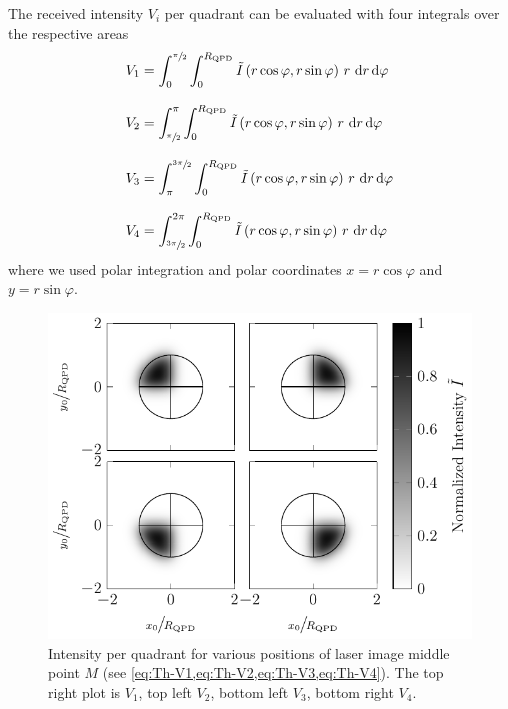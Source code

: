 The received intensity $V_{i}$ per quadrant can be evaluated with four 
integrals over the respective areas
\begin{subequations}
\begin{align}
  V_{\mathrm{1}} & = \int_{0}^{\sfrac{\pi}{2}}\int_{0}^{R_{\mathrm{QPD}}}
  \tilde{I}\left( r\cos\varphi, r\sin\varphi 
  \right)\,r\,\dd{r}\dd{\varphi}
  \label{eq:Th-V1}
  \\[3mm]
  V_{\mathrm{2}} & = \int_{\sfrac{\pi}{2}}^{\pi}\int_{0}^{R_{\mathrm{QPD}}}
  \tilde{I}\left(r\cos\varphi, 
  r\sin\varphi\right)\,r\,\dd{r}\dd{\varphi}
  \label{eq:Th-V2}
  \\[3mm]
  V_{\mathrm{3}} & = \int_{\pi}^{\sfrac{3\pi}{2}}\int_{0}^{R_{\mathrm{QPD}}}
  \tilde{I}\left(r\cos\varphi, 
  r\sin\varphi\right)\,r\,\dd{r}\dd{\varphi}
  \label{eq:Th-V3}
  \\[3mm]
  V_{\mathrm{4}} & = \int_{\sfrac{3\pi}{2}}^{2\pi}\int_{0}^{R_{\mathrm{QPD}}}
  \tilde{I}\left(r\cos\varphi, 
  r\sin\varphi\right)\,r\,\dd{r}\dd{\varphi}
  \label{eq:Th-V4}
\end{align}
\end{subequations}
where we used polar integration and polar coordinates $x=r\cos\varphi$ and 
$y=r\sin\varphi$.

\begin{figure}[tbp]
  \centering
  \includegraphics[]{Plots/cache/V_quadrant.pdf}
  \caption{Intensity per quadrant for various positions of laser image middle 
    point $M$ (see \cref{eq:Th-V1,eq:Th-V2,eq:Th-V3,eq:Th-V4}). The top right 
  plot is $V_{1}$, top left $V_{2}$, bottom left $V_{3}$, bottom right 
$V_{4}$.}
  \label{fig:Th-quadrant_Intensity}
\end{figure}

